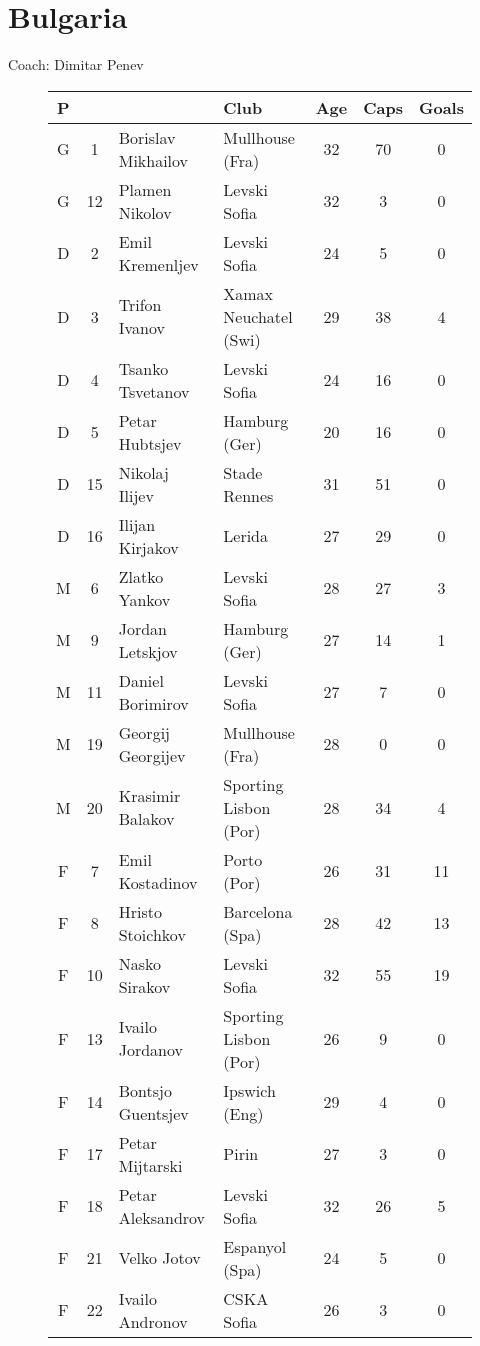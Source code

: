 \chapter{Bulgaria}
\newline
\newline
Coach: Dimitar Penev
\begin{figure}[H]
\begin{tabular}{c c l l c c c}
P & & & Club & Age & Caps & Goals \\ \hline
G & 1 & Borislav Mikhailov & Mullhouse (Fra) & 32 & 70 & 0 \\
G & 12 & Plamen Nikolov & Levski Sofia & 32 & 3 & 0 \\ \hline
D & 2 & Emil Kremenljev & Levski Sofia & 24 & 5 & 0 \\
D & 3 & Trifon Ivanov & Xamax Neuchatel (Swi) & 29 & 38 & 4 \\
D & 4 & Tsanko Tsvetanov & Levski Sofia & 24 & 16 & 0 \\
D & 5 & Petar Hubtsjev & Hamburg (Ger) & 20 & 16 & 0 \\
D & 15 & Nikolaj Ilijev & Stade Rennes & 31 & 51 & 0 \\
D & 16 & Ilijan Kirjakov & Lerida & 27 & 29 & 0 \\ \hline
M & 6 & Zlatko Yankov & Levski Sofia & 28 & 27 & 3 \\
M & 9 & Jordan Letskjov & Hamburg (Ger) & 27 & 14 & 1 \\
M & 11 & Daniel Borimirov & Levski Sofia & 27 & 7 & 0 \\
M & 19 & Georgij Georgijev & Mullhouse (Fra) & 28 & 0 & 0 \\
M & 20 & Krasimir Balakov & Sporting Lisbon (Por) & 28 & 34 & 4 \\ \hline
F & 7 & Emil Kostadinov & Porto (Por) & 26 & 31 & 11 \\
F & 8 & Hristo Stoichkov & Barcelona (Spa) & 28 & 42 & 13 \\
F & 10 & Nasko Sirakov & Levski Sofia & 32 & 55 & 19 \\
F & 13 & Ivailo Jordanov & Sporting Lisbon (Por) & 26 & 9 & 0 \\
F & 14 & Bontsjo Guentsjev & Ipswich (Eng) & 29 & 4 & 0 \\
F & 17 & Petar Mijtarski &  Pirin & 27 & 3 & 0 \\
F & 18 & Petar Aleksandrov & Levski Sofia & 32 & 26 & 5 \\
F & 21 & Velko Jotov & Espanyol (Spa) & 24 & 5 & 0 \\
F & 22 & Ivailo Andronov &  CSKA Sofia & 26 & 3 & 0 \\ \hline
\end{tabular}
\end{figure}
